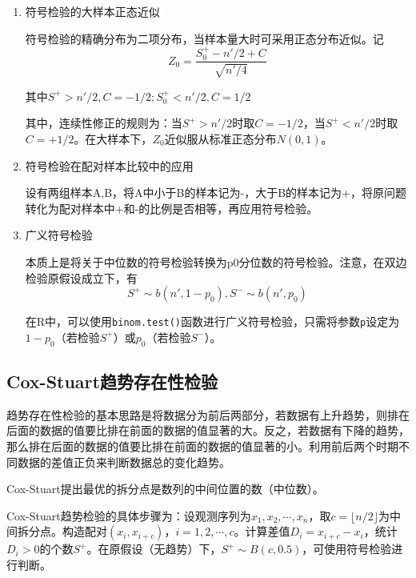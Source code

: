 \documentclass[
]{book}
\begin{document}
\begin{enumerate}
\begin{verbatim}
## 
##  Exact binomial test
## 
## data:  sum(build.price > 37) and length(build.price)
## number of successes = 3, number of trials = 16, p-value = 0.02127
## alternative hypothesis: true probability of success is not equal to 0.5
## 95 percent confidence interval:
##  0.04047373 0.45645655
## sample estimates:
## probability of success 
##                 0.1875
\end{verbatim}
\item
  符号检验的大样本正态近似

  符号检验的精确分布为二项分布，当样本量大时可采用正态分布近似。记\[
  Z_0 = \frac{S_0^+-n'/2+C}{\sqrt{n'/4}}
  \]

  其中\(S^+>n'/2,C=-1/2;S^+_0<n'/2,C=1/2\)

  其中，连续性修正的规则为：当\(S^+ > n'/2\)时取\(C = -1/2\)，当\(S^+ < n'/2\)时取\(C = +1/2\)。在大样本下，\(Z_0\)近似服从标准正态分布\(N(0,1)\)。
\item
  符号检验在配对样本比较中的应用

  设有两组样本A,B，将A中小于B的样本记为-，大于B的样本记为+，将原问题转化为配对样本中+和-的比例是否相等，再应用符号检验。
\item
  广义符号检验

  本质上是将关于中位数的符号检验转换为p0分位数的符号检验。注意，在双边检验原假设成立下，有\[
  S^+\sim b(n',1-p_0),S^-\sim b(n',p_0)
  \]

  在R中，可以使用\texttt{binom.test()}函数进行广义符号检验，只需将参数\texttt{p}设定为\(1-p_0\)（若检验\(S^+\)）或\(p_0\)（若检验\(S^-\)）。
\end{enumerate}

\subsection{Cox-Stuart趋势存在性检验}\label{cox-stuartux8d8bux52bfux5b58ux5728ux6027ux68c0ux9a8c}

趋势存在性检验的基本思路是将数据分为前后两部分，若数据有上升趋势，则排在后面的数据的值要比排在前面的数据的值显著的大。反之，若数据有下降的趋势，那么排在后面的数据的值要比排在前面的数据的值显著的小。利用前后两个时期不同数据的差值正负来判断数据总的变化趋势。

Cox-Stuart提出最优的拆分点是数列的中间位置的数（中位数）。

Cox-Stuart趋势检验的具体步骤为：设观测序列为\(x_1, x_2, \cdots, x_n\)，取\(c = \lfloor n/2 \rfloor\)为中间拆分点。构造配对\((x_i, x_{i+c})\)，\(i = 1, 2, \cdots, c\)。计算差值\(D_i = x_{i+c} - x_i\)，统计\(D_i > 0\)的个数\(S^+\)。在原假设（无趋势）下，\(S^+ \sim B(c, 0.5)\)，可使用符号检验进行判断。
\end{document}
